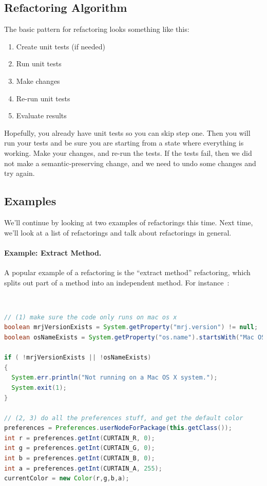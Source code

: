 \subsection*{Refactoring Algorithm}
The basic pattern for refactoring looks something like this:

\begin{enumerate}
	\item Create unit tests (if needed)
	\item Run unit tests
	\item Make changes
	\item Re-run unit tests
	\item Evaluate results
\end{enumerate}

Hopefully, you already have unit tests so you can skip step one. Then you will run your tests and be sure you are starting from a state where everything is working. Make your changes, and re-run the tests. If the tests fail, then we did not make a semantic-preserving change, and we need to undo some changes and try again.


\subsection*{Examples}
We'll continue by looking at two examples of refactorings this time.
Next time, we'll look at a list of refactorings and talk about refactorings in
general.

\paragraph{Example: Extract Method.} A popular example of a refactoring
is the ``extract method'' refactoring, which splits out part of a
method into an independent method. For instance~\cite{ref:extmeth}:

{\tt
\begin{lstlisting}[language=Java]
// (1) make sure the code only runs on mac os x
boolean mrjVersionExists = System.getProperty("mrj.version") != null;
boolean osNameExists = System.getProperty("os.name").startsWith("Mac OS");

if ( !mrjVersionExists || !osNameExists)
{
  System.err.println("Not running on a Mac OS X system.");
  System.exit(1);
}

// (2, 3) do all the preferences stuff, and get the default color
preferences = Preferences.userNodeForPackage(this.getClass());
int r = preferences.getInt(CURTAIN_R, 0);
int g = preferences.getInt(CURTAIN_G, 0);
int b = preferences.getInt(CURTAIN_B, 0);
int a = preferences.getInt(CURTAIN_A, 255);
currentColor = new Color(r,g,b,a);
\end{lstlisting}
}

